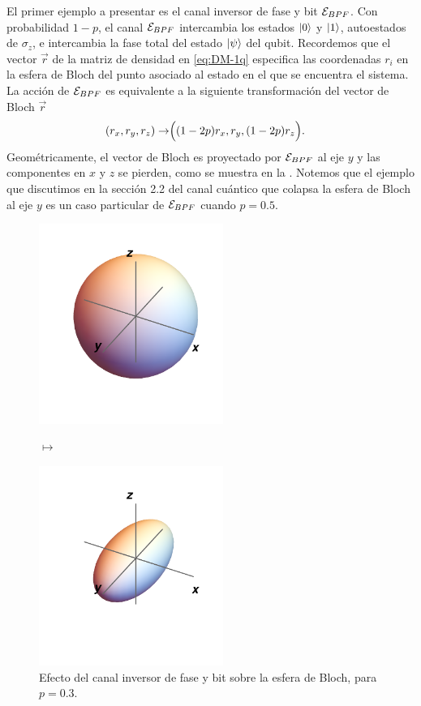 El primer ejemplo a presentar es el canal inversor de fase y bit $\mathcal{E}_{BPF}$. 
Con probabilidad $1-p$, el canal $\mathcal{E}_{BPF}$ intercambia 
los estados $\ket{0}$ y $\ket{1}$, 
autoestados de $\sigma_z$, e intercambia la fase total
del estado $\ket{\psi}$ del qubit. 
Recordemos que el vector $\vec{r}$ de la matriz de densidad en \eqref{eq:DM-1q} 
especifica las coordenadas $r_i$ en la esfera de Bloch del punto asociado al estado
en el que se encuentra el sistema. La acción de $\mathcal{E}_{BPF}$ es 
equivalente a la siguiente transformación del vector de Bloch $\vec{r}$
\begin{align}
\qty(r_x,r_y,r_z)\rightarrow&\Big(\qty(1-2p)r_x,r_y,\qty(1-2p)r_z\Big).
\label{eq:bit-phase-flip-Bloch-trans}
\end{align}
Geométricamente, el vector de Bloch es proyectado por $\mathcal{E}_{BPF}$ 
al eje $y$ y las componentes en $x$ y $z$ se pierden, como 
se muestra en la .
Notemos que el ejemplo que discutimos en la sección 2.2 del 
canal cuántico que colapsa la esfera de Bloch al eje $y$ es un caso
particular de $\mathcal{E}_{BPF}$ cuando $p=0.5$.
\begin{figure}[H]
\centering
\begin{minipage}{.4\textwidth}
    \centering
    \includegraphics[width=6cm]{images/bloch-ball}
\end{minipage}
$\longmapsto$
\begin{minipage}{0.4\textwidth}
    \centering
    \includegraphics[width=6cm]{images/bit-phase-flip}
\end{minipage}
\caption{Efecto del canal inversor de fase y bit sobre la esfera de Bloch, 
para $p=0.3$.}
\label{fig:bit-phase-flip}
\end{figure}
